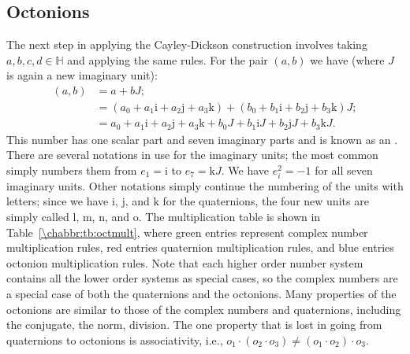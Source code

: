 \subsection{Octonions}
The next step in applying the Cayley-Dickson construction involves taking $a,b,c,d\in\mathbb{H}$ and applying the same rules.  For the pair $(a,b)$ we have (where $J$ is again a new imaginary unit):
\begin{equation}
\begin{split}
	(a,b) &= a+bJ;\\
	&= (a_0+a_1\mathrm{i}+a_2\mathrm{j}+a_3\mathrm{k})+ (b_0+b_1\mathrm{i}+b_2\mathrm{j}+b_3\mathrm{k})J;\\
	&= a_0+a_1\mathrm{i}+a_2\mathrm{j}+a_3\mathrm{k} + b_0J+b_1\mathrm{i}J+b_2\mathrm{j}J+b_3\mathrm{k}J.
\end{split}
\end{equation}
This number has one scalar part and seven imaginary parts and is known as an .  There are several notations in use for the imaginary units; the most common simply numbers them from $e_1=\mathrm{i}$ to $e_7=\mathrm{k}J$.  We have $e_i^2=-1$ for all seven imaginary units. Other notations simply continue the numbering of the units with letters; since we have $\mathrm{i}$, $\mathrm{j}$, and $\mathrm{k}$ for the quaternions, the four new units are simply called  $\mathrm{l}$, $\mathrm{m}$, $\mathrm{n}$, and $\mathrm{o}$. The multiplication table is shown in Table~\ref{\chabbr:tb:octmult}, where \textcolor{OCGreenThread}{green entries} represent complex number multiplication rules, \textcolor{OCCarnegieRed}{red entries} quaternion multiplication rules, and \textcolor{OCHighlandsSkyBlue}{blue entries} octonion multiplication rules. Note that each higher order number system contains all the lower order systems as special cases, so the complex numbers are a special case of both the quaternions and the octonions.  Many properties of the octonions are similar to those of the complex numbers and quaternions, including the conjugate, the norm, division.  The one property that is lost in going from quaternions to octonions is associativity, i.e., $o_1\cdot(o_2\cdot o_3)\ne (o_1\cdot o_2)\cdot o_3$.

